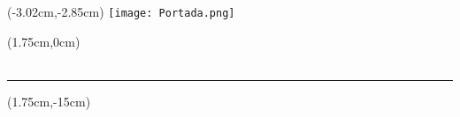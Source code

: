 
\begin{titlepage}

\thispagestyle{empty}

\begin{textblock*}{\paperheight}(-3.02cm,-2.85cm)
    \texttt{[image: Portada.png]}
\end{textblock*}

\begin{textblock*}{\textwidth}(1.75cm,0cm)
    \centering
     {\fontsize{20pt}{25pt}
     {
     {\MakeUppercase\Universidad}}}\\[0.5cm]
     {\fontsize{14pt}{17pt}
     {}}\\[0.42cm] 
     {\fontsize{13pt}{16pt}
     {}}
    \noindent\rule[-0.22cm]{\textwidth}{5pt} %
\end{textblock*}

\vfill

\begin{textblock*}{\textwidth}(1.75cm,-15cm)%
    \color{GrisUPV}
    \noindent
    \begin{minipage}{\textwidth}
        \begin{spacing}{2.1}
            \centering
            {\fontsize{25pt}{30pt}
            {\addfontfeature{}
            \textbf{\titulo}}}
            {\fontsize{15pt}{20pt}
            {\addfontfeature{}
            \\ \practica}}
        \end{spacing}
    \end{minipage}
\end{textblock*}

\hfill


\end{titlepage}

